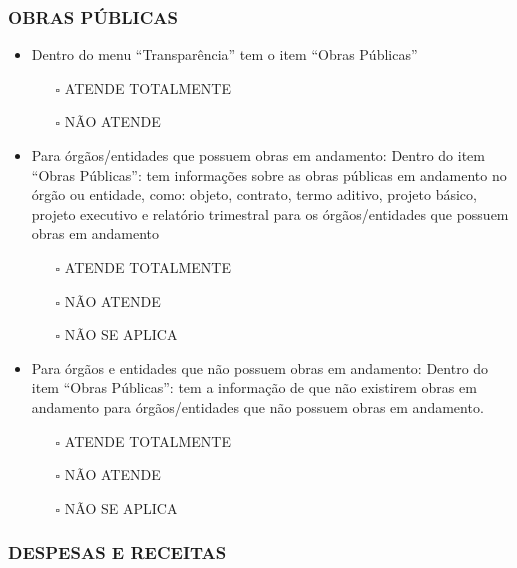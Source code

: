 \documentclass[
]{book}
\providecommand{\tightlist}{%
  \setlength{\itemsep}{0pt}\setlength{\parskip}{0pt}}
\begin{document}
\hypertarget{obras-puxfablicas-1}{%
\subsubsection*{OBRAS PÚBLICAS}\label{obras-puxfablicas-1}}

\begin{itemize}
\tightlist
\item
  Dentro do menu ``Transparência'' tem o item ``Obras Públicas''

  \begin{itemize}
  \tightlist
  \item[$\square$]
    ATENDE TOTALMENTE
  \item[$\square$]
    NÃO ATENDE
  \end{itemize}
\item
  Para órgãos/entidades que possuem obras em andamento: Dentro do item ``Obras Públicas'': tem informações sobre as obras públicas em andamento no órgão ou entidade, como: objeto, contrato, termo aditivo, projeto básico, projeto executivo e relatório trimestral para os órgãos/entidades que possuem obras em andamento

  \begin{itemize}
  \tightlist
  \item[$\square$]
    ATENDE TOTALMENTE
  \item[$\square$]
    NÃO ATENDE
  \item[$\square$]
    NÃO SE APLICA
  \end{itemize}
\item
  Para órgãos e entidades que não possuem obras em andamento: Dentro do item ``Obras Públicas'': tem a informação de que não existirem obras em andamento para órgãos/entidades que não possuem obras em andamento.

  \begin{itemize}
  \tightlist
  \item[$\square$]
    ATENDE TOTALMENTE
  \item[$\square$]
    NÃO ATENDE
  \item[$\square$]
    NÃO SE APLICA
  \end{itemize}
\end{itemize}

\hypertarget{despesas-e-receitas-1}{%
\subsubsection*{DESPESAS E RECEITAS}\label{despesas-e-receitas-1}}
\end{document}

